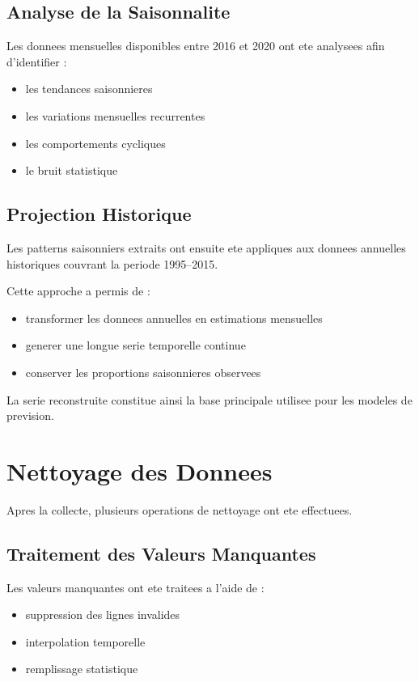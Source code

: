 \documentclass[12pt,a4paper]{report}
\begin{document}
\subsection{Analyse de la Saisonnalite}

Les donnees mensuelles disponibles entre 2016 et 2020 ont ete analysees
afin d'identifier :

\begin{itemize}
    \item les tendances saisonnieres
    \item les variations mensuelles recurrentes
    \item les comportements cycliques
    \item le bruit statistique
\end{itemize}

\subsection{Projection Historique}

Les patterns saisonniers extraits ont ensuite ete appliques aux donnees
annuelles historiques couvrant la periode 1995--2015.

Cette approche a permis de :

\begin{itemize}
    \item transformer les donnees annuelles en estimations mensuelles
    \item generer une longue serie temporelle continue
    \item conserver les proportions saisonnieres observees
\end{itemize}

La serie reconstruite constitue ainsi la base principale utilisee pour
les modeles de prevision.

\section{Nettoyage des Donnees}

Apres la collecte, plusieurs operations de nettoyage ont ete effectuees.

\subsection{Traitement des Valeurs Manquantes}

Les valeurs manquantes ont ete traitees a l'aide de :

\begin{itemize}
    \item suppression des lignes invalides
    \item interpolation temporelle
    \item remplissage statistique
\end{itemize}
\end{document}

